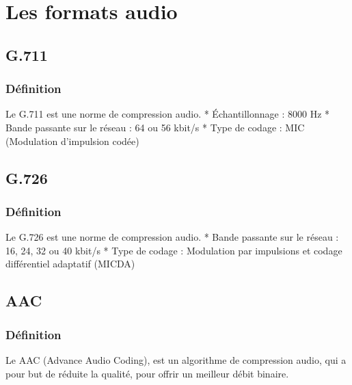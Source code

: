 	\section{Les formats audio}
		\subsection{G.711}
			\subsubsection{Définition}
			Le G.711 est une norme de compression audio.
				* Échantillonnage : 8000 Hz 
				* Bande passante sur le réseau : 64 ou 56 kbit/s
				* Type de codage : MIC (Modulation d'impulsion codée)
		\subsection{G.726}
			\subsubsection{Définition}
			Le G.726 est une norme de compression audio.
				* Bande passante sur le réseau : 16, 24, 32 ou 40 kbit/s
				* Type de codage : Modulation par impulsions et codage différentiel adaptatif (MICDA)
		\subsection{AAC}
			\subsubsection{Définition}
			Le AAC (Advance Audio Coding), est un algorithme de compression audio, qui a
			pour but de réduite la qualité, pour offrir un meilleur débit binaire.
